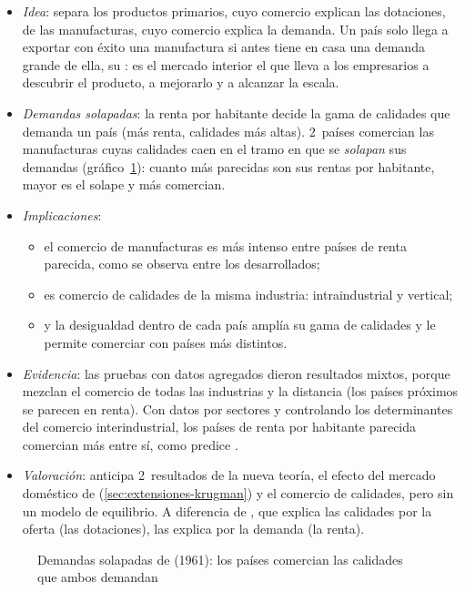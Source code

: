 \documentclass[11pt]{article}
\begin{document}
\begin{itemize}
\item \emph{Idea}: \textcite{Linder1961Essay} separa los productos primarios, cuyo comercio explican las dotaciones, de las manufacturas, cuyo comercio explica la demanda. Un país solo llega a exportar con éxito una manufactura si antes tiene en casa una demanda grande de ella, su : es el mercado interior el que lleva a los empresarios a descubrir el producto, a mejorarlo y a alcanzar la escala.
\item \emph{Demandas solapadas}: la renta por habitante decide la gama de calidades que demanda un país (más renta, calidades más altas). 2~países comercian las manufacturas cuyas calidades caen en el tramo en que se \emph{solapan} sus demandas (gráfico~\ref{fig:linder}): cuanto más parecidas son sus rentas por habitante, mayor es el solape y más comercian.
\item \emph{Implicaciones}:
  \begin{itemize}
  \item el comercio de manufacturas es más intenso entre países de renta parecida, como se observa entre los desarrollados;
  \item es comercio de calidades de la misma industria: intraindustrial y vertical;
  \item y la desigualdad dentro de cada país amplía su gama de calidades y le permite comerciar con países más distintos.
  \end{itemize}
\item \emph{Evidencia}: las pruebas con datos agregados dieron resultados mixtos, porque mezclan el comercio de todas las industrias y la distancia (los países próximos se parecen en renta). Con datos por sectores y controlando los determinantes del comercio interindustrial, los países de renta por habitante parecida comercian más entre sí, como predice \nocite{Hallak2010Product}.
\item \emph{Valoración}: anticipa 2~resultados de la nueva teoría, el efecto del mercado doméstico de \textcite{Krugman1980Scale} (\ref{sec:extensiones-krugman}) y el comercio de calidades, pero sin un modelo de equilibrio. A diferencia de , que explica las calidades por la oferta (las dotaciones),  las explica por la demanda (la renta).
\end{itemize}

\begin{figure}[H]
\centering
\caption{Demandas solapadas de  (1961): los países comercian las calidades que ambos demandan}\label{fig:linder}
\end{figure}
\end{document}
